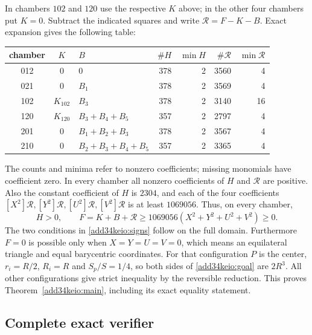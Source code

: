\documentclass[11pt,a4paper]{article}
\numberwithin{equation}{section}
\theoremstyle{definition}
\theoremstyle{remark}
\begin{document}
In chambers $102$ and $120$ use the respective $K$ above; in the other
four chambers put $K=0$. Subtract the indicated squares and write
$\mathcal R=F-K-B$. Exact expansion gives the following table:
\begin{center}
\begin{tabular}{cclrrrr}
\toprule
chamber&$K$&$B$&$\#H$&$\min H$&$\#\mathcal R$&$\min\mathcal R$\\
\midrule
012&0&0&378&2&3560&4\\
021&0&$B_1$&378&2&3569&4\\
102&$K_{102}$&$B_3$&378&2&3140&16\\
120&$K_{120}$&$B_3+B_4+B_5$&357&2&2797&4\\
201&0&$B_1+B_2+B_3$&378&2&3567&4\\
210&0&$B_2+B_3+B_4+B_5$&357&2&3365&4\\
\bottomrule
\end{tabular}
\end{center}
The counts and minima refer to nonzero coefficients; missing monomials
have coefficient zero.  In every chamber all nonzero coefficients of
$H$ and $\mathcal R$ are positive. Also the constant coefficient of
$H$ is $2304$, and each of the four coefficients
$[X^2]\mathcal R,[Y^2]\mathcal R,[U^2]\mathcal R,[V^2]\mathcal R$
is at least $1069056$. Thus, on every chamber,
\[
 H>0,\qquad
 F=K+B+\mathcal R\ge
 1069056(X^2+Y^2+U^2+V^2)\ge0.
\]
The two conditions in \eqref{add34keio:signs} follow on the full domain.
Furthermore $F=0$ is possible only when $X=Y=U=V=0$, which means
an equilateral triangle and equal barycentric coordinates.
For that configuration $P$ is the center, $r_i=R/2$, $R_i=R$ and
$S_p/S=1/4$, so both sides of \eqref{add34keio:goal} are $2R^3$.
All other configurations give strict inequality by the reversible
reduction. This proves Theorem~\ref{add34keio:main}, including its exact equality
statement.

\subsection{Complete exact verifier}
\end{document}
